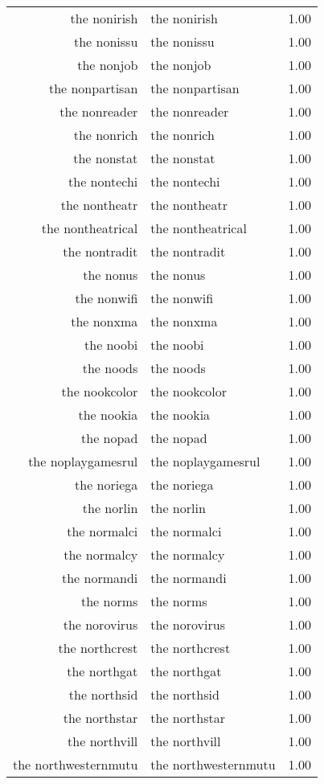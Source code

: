 \begin{table}[ht]
\begin{tabular}{rlr}
  the nonirish & the nonirish & 1.00 \\ 
  the nonissu & the nonissu & 1.00 \\ 
  the nonjob & the nonjob & 1.00 \\ 
  the nonpartisan & the nonpartisan & 1.00 \\ 
  the nonreader & the nonreader & 1.00 \\ 
  the nonrich & the nonrich & 1.00 \\ 
  the nonstat & the nonstat & 1.00 \\ 
  the nontechi & the nontechi & 1.00 \\ 
  the nontheatr & the nontheatr & 1.00 \\ 
  the nontheatrical & the nontheatrical & 1.00 \\ 
  the nontradit & the nontradit & 1.00 \\ 
  the nonus & the nonus & 1.00 \\ 
  the nonwifi & the nonwifi & 1.00 \\ 
  the nonxma & the nonxma & 1.00 \\ 
  the noobi & the noobi & 1.00 \\ 
  the noods & the noods & 1.00 \\ 
  the nookcolor & the nookcolor & 1.00 \\ 
  the nookia & the nookia & 1.00 \\ 
  the nopad & the nopad & 1.00 \\ 
  the noplaygamesrul & the noplaygamesrul & 1.00 \\ 
  the noriega & the noriega & 1.00 \\ 
  the norlin & the norlin & 1.00 \\ 
  the normalci & the normalci & 1.00 \\ 
  the normalcy & the normalcy & 1.00 \\ 
  the normandi & the normandi & 1.00 \\ 
  the norms & the norms & 1.00 \\ 
  the norovirus & the norovirus & 1.00 \\ 
  the northcrest & the northcrest & 1.00 \\ 
  the northgat & the northgat & 1.00 \\ 
  the northsid & the northsid & 1.00 \\ 
  the northstar & the northstar & 1.00 \\ 
  the northvill & the northvill & 1.00 \\ 
  the northwesternmutu & the northwesternmutu & 1.00 \\ 

\end{tabular}
\end{table}
